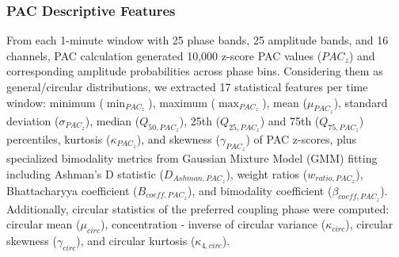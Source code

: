   
\subsubsection{PAC Descriptive Features}

From each 1-minute window with 25 phase bands, 25 amplitude bands, and 16 channels, PAC calculation generated 10,000 z-score PAC values (${PAC}_z$) and corresponding amplitude probabilities across phase bins. Considering them as general/circular distributions, we extracted 17 statistical features per time window: minimum ($\min_{{PAC}_z}$), maximum ($\max_{{PAC}_z}$), mean ($\mu_{{PAC}_z}$), standard deviation ($\sigma_{{PAC}_z}$), median ($Q_{50,{PAC}_z}$), 25th ($Q_{25,{PAC}_z}$) and 75th ($Q_{75,{PAC}_z}$) percentiles, kurtosis ($\kappa_{{PAC}_z}$), and skewness ($\gamma_{{PAC}_z}$) of PAC z-scores, plus specialized bimodality metrics from Gaussian Mixture Model (GMM) fitting including Ashman's D statistic ($D_{Ashman,{PAC}_z}$), weight ratios ($w_{ratio,{PAC}_z}$), Bhattacharyya coefficient ($B_{coeff,{PAC}_z}$), and bimodality coefficient ($\beta_{coeff,{PAC}_z}$). Additionally, circular statistics of the preferred coupling phase were computed: circular mean ($\mu_{circ}$), concentration - inverse of circular variance ($\kappa_{circ}$), circular skewness ($\gamma_{circ}$), and circular kurtosis ($\kappa_{4,circ}$).


